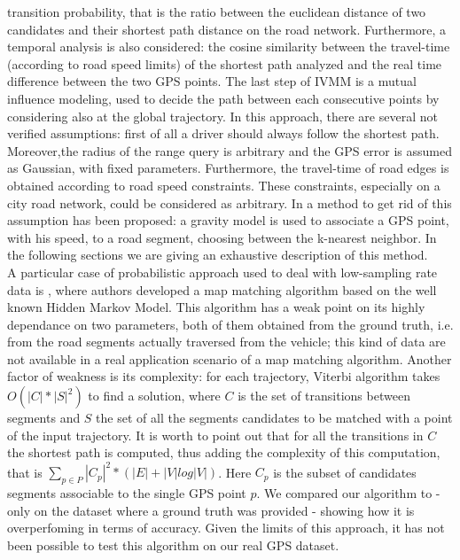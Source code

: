 \documentclass[5p]{elsarticle}
\begin{document}
transition probability, that is the ratio between the 
euclidean distance of two candidates and their shortest path distance on the road network. Furthermore, a temporal analysis is also considered: the cosine similarity 
between the travel-time (according to road speed limits) of 
the shortest path analyzed and the real time difference between the two GPS points. The last step of IVMM is a mutual influence modeling, used to decide the path between 
each consecutive points by considering also at the global trajectory. 
In this approach, there are several not verified assumptions: first of all a driver should always follow the shortest path. Moreover,the radius of the range query is 
arbitrary and the GPS error is assumed as Gaussian,
with fixed parameters. Furthermore, the travel-time of road edges is obtained according to road speed constraints. These constraints, especially on a city road network, 
could be considered as arbitrary. In \cite{cintia2013gravity} a method to get rid of this assumption has been proposed: a gravity model is used to associate a GPS point, with his speed, to a road segment, 
choosing between the k-nearest neighbor. In the following sections we are giving an 
exhaustive description of this method. \\
A particular case of probabilistic approach used to deal with low-sampling rate data is \cite{newson2009hidden}, where authors developed a map matching algorithm based on 
the well known Hidden Markov Model. This algorithm has a weak point on its highly dependance on two parameters, both of them obtained from the ground truth, i.e. from the 
road segments actually traversed from the vehicle; this kind of data are not available in a real application scenario of a map matching algorithm. Another factor of weakness 
is its complexity: for each trajectory, Viterbi algorithm takes $O(|C| * |S|^{2})  $ to find a solution, where $C$ is the set of transitions between segments and $S$ the
set of all the segments candidates to be matched with a point of the input trajectory. It is worth to point out that for all the transitions in $C$ the shortest path is
 computed, thus adding the complexity of this computation, that is $\sum\limits_{p \in P} |C_{p}|^{2}  *(|E| + |V| log |V|)$. Here $C_{p}$ is the subset of candidates 
segments associable to the single GPS point $p$. We compared our algorithm to \cite{newson2009hidden} - only on the dataset where a ground truth was provided - showing how it is overperfoming in terms of accuracy. 
Given the limits of this approach, it has not been possible to test this algorithm on our real GPS dataset. 
\end{document}
